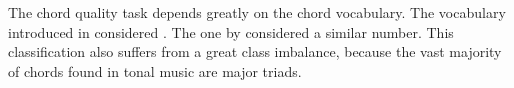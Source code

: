 
The chord quality task depends greatly on the chord
vocabulary. The vocabulary introduced in
\textcite{chen2018functional} considered . The one by \textcite{micchi2020not} considered a
similar number. This classification also suffers from a
great class imbalance, because the vast majority of chords
found in tonal music are major triads.
